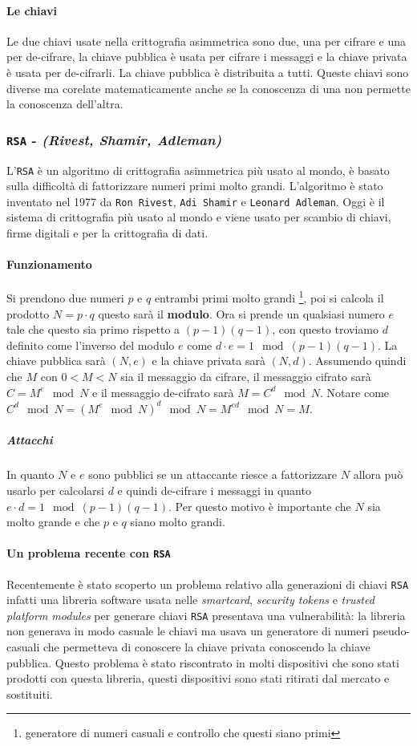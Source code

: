         \paragraph{Le chiavi} Le due chiavi usate nella crittografia asimmetrica sono due, una per cifrare e una per de-cifrare, la chiave pubblica è usata per cifrare i messaggi e la chiave privata è usata per de-cifrarli. La chiave pubblica è distribuita a tutti. Queste chiavi sono diverse ma corelate matematicamente anche se la conoscenza di una non permette la conoscenza dell'altra.
        \subsubsection{\texttt{RSA} - \textit{(Rivest, Shamir, Adleman)}}
            L'\texttt{RSA} è un algoritmo di crittografia asimmetrica più usato al mondo, è basato sulla difficoltà di fattorizzare numeri primi molto grandi. L'algoritmo è stato inventato nel 1977 da \texttt{Ron Rivest}, \texttt{Adi Shamir} e \texttt{Leonard Adleman}. Oggi è il sistema di crittografia più usato al mondo e viene usato per scambio di chiavi, firme digitali e per la crittografia di dati.
            \paragraph{Funzionamento} Si prendono due numeri $ p $ e $ q $ entrambi primi molto grandi \footnote{generatore di numeri casuali e controllo che questi siano primi}, poi si calcola il prodotto $N=p\cdot q$ questo sarà il \textbf{modulo}. Ora si prende un qualsiasi numero $ e $ tale che questo sia primo rispetto a $ (p-1)(q-1) $, con questo troviamo $ d $ definito come l'inverso del modulo $ e $ come $ d\cdot e = 1 \mod (p-1)(q-1) $. La chiave pubblica sarà $ (N,e) $ e la chiave privata sarà $ (N,d) $. Assumendo quindi che $ M $ con $ 0 < M < N $ sia il messaggio da cifrare, il messaggio cifrato sarà $ C = M^e \mod N $ e il messaggio de-cifrato sarà $ M = C^d \mod N $. Notare come $ C^d \mod N = (M^e \mod N)^d \mod N = M^{ed} \mod N = M $.
            \subparagraph{Attacchi} In quanto $ N $ e $ e $ sono pubblici se un attaccante riesce a fattorizzare $ N $ allora può usarlo per calcolarsi $ d $ e quindi de-cifrare i messaggi in quanto $ e\cdot d = 1 \mod (p-1)(q-1) $. Per questo motivo è importante che $ N $ sia molto grande e che $ p $ e $ q $ siano molto grandi. 
            \paragraph{Un problema recente con \texttt{RSA}} Recentemente è stato scoperto un problema relativo alla generazioni di chiavi \texttt{RSA} infatti una libreria software usata nelle \textit{smartcard}, \textit{security tokens} e \textit{trusted platform modules} per generare chiavi \texttt{RSA} presentava una vulnerabilità: la libreria non generava in modo casuale le chiavi ma usava un generatore di numeri pseudo-casuali che permetteva di conoscere la chiave privata conoscendo la chiave pubblica. Questo problema è stato riscontrato in molti dispositivi che sono stati prodotti con questa libreria, questi dispositivi sono stati ritirati dal mercato e sostituiti.
